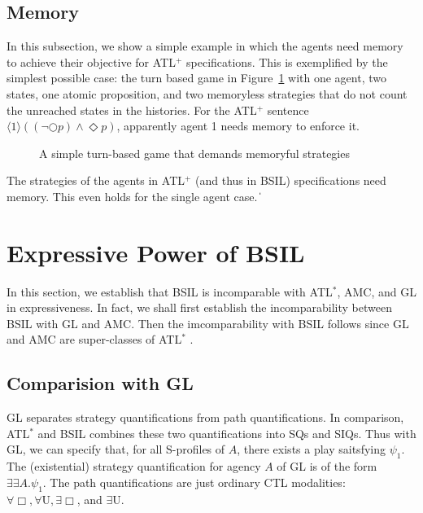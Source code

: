 \documentclass[11pt]{article}
\newcommand{\existsb}{\mbox{$\exists\!\!\exists$}}
\newcommand{\pfrr}{\Box}
\newcommand{\until}{\textrm{U}} %
\newcommand{\pevt}{\Diamond}
\newcommand{\nxt}{\bigcirc}
\def\qed{\ifmmode\|\else{\unskip\nobreak\hfil
\penalty50\hskip1em\null\nobreak\hfil$\blacksquare$
\parfillskip=0pt\finalhyphendemerits=0\endgraf}\fi}
\begin{document}
\subsection{Memory}

In this subsection, we show a simple example in which \label{reply1.in.which}  
the agents need memory to achieve their objective for ATL$^+$ 
specifications.
This is\label{reply1.is.is} exemplified by the simplest possible case: 
the turn based game in Figure~\ref{fig.gg.fin} 
with one agent, two states, one atomic proposition, 
and two memoryless strategies 
that do not count the unreached states in the histories.
For the ATL$^+$ sentence \label{reply2.mem.fin.parenthesis} 
$\langle 1 \rangle ((\neg \nxt p)\wedge \pevt p)$, 
apparently agent 1 needs memory to enforce it.  
\begin{figure}[t]
\begin{center} 

\end{center}
\caption{A simple turn-based game that demands memoryful strategies}
\label{fig.gg.fin}
\end{figure}

{\lemma \label{lemma.mem.fin}
The strategies of the agents in ATL$^+$ 
(and thus in BSIL) specifications need memory.
This even holds for the single agent case.
\qed 
}


\section{Expressive Power of BSIL \label{sec.exp}}

In this section, we establish that BSIL is incomparable with ATL$^*$, 
AMC, and GL \cite{AHK02} in expressiveness.
In fact, we shall first establish the incomparability between BSIL with 
GL and AMC.  
Then the imcomparability with BSIL follows since GL and AMC are super-classes of 
ATL$^*$ \cite{AHK02}.  





\subsection{Comparision with GL\label{subsec.exp.gl}} 

GL separates strategy quantifications\label{reply1.quantificaitons} from path quantifications.  
In comparison, ATL$^*$ and BSIL combines these two quantifications 
into SQs and SIQs.  
Thus with GL, we can specify that, for all S-profiles of $A$, 
there exists a play saitsfying $\psi_1$.  
The (existential) strategy quantification for agency $A$ 
of GL is of the form $\existsb A.\psi_1$.  
The path quantifications are just ordinary CTL modalities: 
$\forall\pfrr, \forall\until, \exists\pfrr$, and 
$\exists\until$.  
\end{document}
